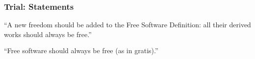 \begin{frame}
\frametitle{Trial: Statements}

\begin{center}
\begin{LARGE}
``A new freedom should be added to the Free Software Definition:
all their derived works should always be free.''
\end{LARGE}
\end{center}
\begin{center}
\begin{LARGE}
``Free software should always be free (as in gratis).''
\end{LARGE}
\end{center}

\end{frame}


